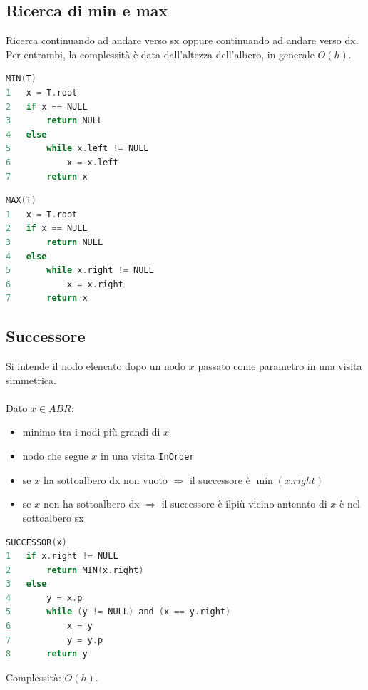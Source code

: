 \subsection{Ricerca di min e max}
Ricerca continuando ad andare verso sx oppure continuando ad andare verso dx. Per entrambi, la complessità è data dall'altezza dell'albero, in generale $O(h)$.
\begin{multicols}{2}
\begin{mdframed}
\begin{lstlisting}[language=C]
MIN(T)
1   x = T.root
2   if x == NULL
3       return NULL
4   else
5       while x.left != NULL
6           x = x.left
7       return x
\end{lstlisting}
\end{mdframed}
\begin{mdframed}
\begin{lstlisting}[language=C]
MAX(T)
1   x = T.root
2   if x == NULL
3       return NULL
4   else
5       while x.right != NULL
6           x = x.right
7       return x
\end{lstlisting}
\end{mdframed}
\end{multicols}

\subsection{Successore}
Si intende il nodo elencato dopo un nodo $x$ passato come parametro in una visita simmetrica. \\~\\
Dato $x \in ABR$:
\begin{itemize}
    \item minimo tra i nodi più grandi di $x$
    \item nodo che segue $x$ in una visita \verb|InOrder|
    \item se $x$ ha sottoalbero dx non vuoto $\Rightarrow$ il successore è $\min(x.right)$
    \item se $x$ non ha sottoalbero dx $\Rightarrow$ il successore è ilpiù vicino antenato di $x$ è nel sottoalbero sx
\end{itemize}
\begin{mdframed}
\begin{lstlisting}[language=C]
SUCCESSOR(x)
1   if x.right != NULL
2       return MIN(x.right)
3   else
4       y = x.p
5       while (y != NULL) and (x == y.right)
6           x = y
7           y = y.p
8       return y
\end{lstlisting}
\end{mdframed}
Complessità: $O(h)$.

